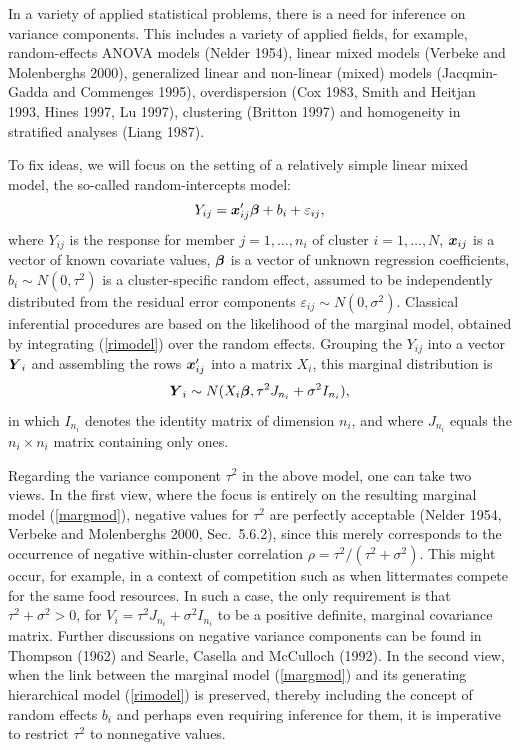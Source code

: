 \documentclass[useAMS,usenatbib,referee]{biom}
\newcommand{\x}{\mbox{\boldmath $x$}}
\newcommand{\Y}{\mbox{\boldmath $Y$}}
\newcommand{\bfbeta}{\mbox{\boldmath $\beta$}}
\begin{document}
In a variety of applied statistical problems, there is a need for
inference on variance components. This includes a variety of applied
fields, for example, random-effects ANOVA models (Nelder 1954), linear
mixed models (Verbeke and Molenberghs 2000), generalized linear and
non-linear (mixed) models (Jacqmin-Gadda and Commenges 1995),
overdispersion (Cox 1983, Smith and Heitjan 1993, Hines 1997, Lu
1997), clustering (Britton 1997) and homogeneity in stratified
analyses (Liang 1987).

To fix ideas, we will focus on the setting of a relatively simple
linear mixed model, the so-called random-intercepts model:
\begin{equation}
Y_{ij}=\x_{ij}'\bfbeta+b_i+\varepsilon_{ij},
\label{rimodel}
\end{equation}
where $Y_{ij}$ is the response for member $j=1,\dots,n_i$ of cluster
$i=1,\dots,N$, $\x_{ij}$ is a vector of known covariate values,
$\bfbeta$ is a vector of unknown regression coefficients, $b_i\sim
N(0,\tau^2)$ is a cluster-specific random effect, assumed to be
independently distributed from the residual error components
$\varepsilon_{ij}\sim N(0,\sigma^2)$. Classical inferential procedures
are based on the likelihood of the marginal model, obtained by
integrating (\ref{rimodel}) over the random effects. Grouping the
$Y_{ij}$ into a vector $\Y_i$ and assembling the rows $\x_{ij}'$ into
a matrix $X_i$, this marginal distribution is
\begin{equation}
\label{margmod}
\Y_i\sim N(X_i\bfbeta,\tau^2 J_{n_i}+\sigma^2 I_{n_i}),
\end{equation}
in which $I_{n_i}$ denotes the identity matrix of dimension $n_i$, and where $J_{n_i}$ equals the $n_i \times n_i$ matrix containing only ones. 

Regarding the variance component $\tau^2$ in the above model, one can
take two views. In the first view, where the focus is entirely on the
resulting marginal model (\ref{margmod}), negative values for $\tau^2$
are perfectly acceptable (Nelder 1954, Verbeke and Molenberghs 2000,
Sec.~5.6.2), since this merely corresponds to the occurrence of
negative within-cluster correlation
$\rho=\tau^2/(\tau^2+\sigma^2)$. This might occur, for example, in a
context of competition such as when littermates compete for the same
food resources. In such a case, the only requirement is that $\tau^2 +
\sigma^2 > 0$, for $V_i=\tau^2 J_{n_i}+\sigma^2 I_{n_i}$ to be a
positive definite, marginal covariance matrix. Further discussions on
negative variance components can be found in Thompson (1962) and
Searle, Casella and McCulloch (1992). In the second view, when the
link between the marginal model (\ref{margmod}) and its generating
hierarchical model (\ref{rimodel}) is preserved, thereby including the
concept of random effects $b_i$ and perhaps even requiring inference
for them, it is imperative to restrict $\tau^2$ to nonnegative values.
\end{document}
